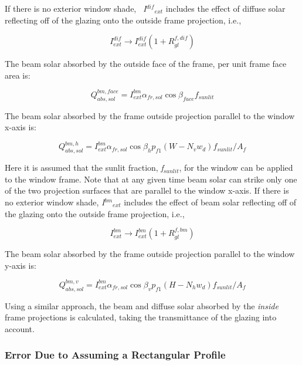 If there is no exterior window shade, \emph{~I\(^{dif}\)\(_{ext}\)} includes the effect of diffuse solar reflecting off of the glazing onto the outside frame projection, i.e.,

\begin{equation}
I_{ext}^{dif} \to I_{ext}^{dif}\left( {1 + R_{gl}^{f,dif}} \right)
\end{equation}

The beam solar absorbed by the outside face of the frame, per unit frame face area is:

\begin{equation}
Q_{abs,sol}^{bm,face} = I_{ext}^{bm}{\alpha_{fr,sol}}\cos {\beta_{face}}{f_{sunlit}}
\end{equation}

The beam solar absorbed by the frame outside projection parallel to the window x-axis is:

\begin{equation}
Q_{abs,sol}^{bm,h} = I_{ext}^{bm}{\alpha_{fr,sol}}\cos {\beta_h}{p_{f1}}\left( {W - {N_v}{w_d}} \right){f_{sunlit}}/{A_f}
\end{equation}

Here it is assumed that the sunlit fraction, \emph{f\(_{sunlit}\)}, for the window can be applied to the window frame. Note that at any given time beam solar can strike only one of the two projection surfaces that are parallel to the window x-axis. If there is no exterior window shade, \emph{I\(^{bm}\)\(_{ext}\)} includes the effect of beam solar reflecting off of the glazing onto the outside frame projection, i.e.,

\begin{equation}
I_{ext}^{bm} \to I_{ext}^{bm}\left( {1 + R_{gl}^{f,bm}} \right)
\end{equation}

The beam solar absorbed by the frame outside projection parallel to the window y-axis is:

\begin{equation}
Q_{abs,sol}^{bm,v} = I_{ext}^{bm}{\alpha_{fr,sol}}\cos {\beta_v}{p_{f1}}\left( {H - {N_h}{w_d}} \right){f_{sunlit}}/{A_f}
\end{equation}

Using a similar approach, the beam and diffuse solar absorbed by the \emph{inside} frame projections is calculated, taking the transmittance of the glazing into account.

\subsubsection{Error Due to Assuming a Rectangular Profile}\label{error-due-to-assuming-a-rectangular-profile}

